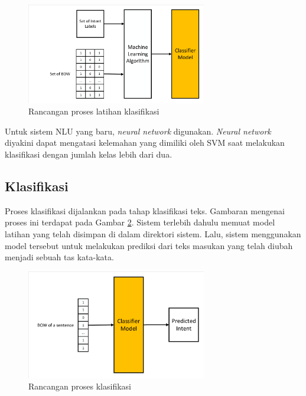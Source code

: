 \begin{figure}[H]
	\centering
	\includegraphics[width=0.7\textwidth, trim=3 3 3 3, clip]{resources/4-design_train_class.pdf}
	\caption{Rancangan proses latihan klasifikasi}
	\label{fig:design_train_class}
\end{figure}

Untuk sistem NLU yang baru, \textit{neural network} digunakan. \textit{Neural network} diyakini dapat mengatasi kelemahan yang dimiliki oleh SVM saat melakukan klasifikasi dengan jumlah kelas lebih dari dua.

\subsection{Klasifikasi}

Proses klasifikasi dijalankan pada tahap klasifikasi teks. Gambaran mengenai proses ini terdapat pada Gambar \ref{fig:design_class_class}. Sistem terlebih dahulu memuat model latihan yang telah disimpan di dalam direktori sistem. Lalu, sistem menggunakan model tersebut untuk melakukan prediksi dari teks masukan yang telah diubah menjadi sebuah tas kata-kata.

\begin{figure}[H]
	\centering
	\includegraphics[width=0.7\textwidth, trim=2 2 2 2, clip]{resources/4-design_class_class.pdf}
	\caption{Rancangan proses klasifikasi}
	\label{fig:design_class_class}
\end{figure}

